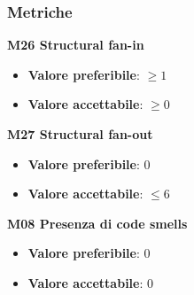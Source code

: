         \subsubsection{Metriche}
            \textbf{M26 Structural fan-in}
                \begin{itemize}
                    \item \textbf{Valore preferibile}: $ \ge 1$
                    \item \textbf{Valore accettabile}: $ \ge 0$
                \end{itemize}
            \textbf{M27 Structural fan-out}
                \begin{itemize}
                    \item \textbf{Valore preferibile}: $0$
                    \item \textbf{Valore accettabile}: $ \le 6$
                \end{itemize}
            \textbf{M08 Presenza di code smells}
            \begin{itemize}
            	\item \textbf{Valore preferibile}: $0$
            	\item \textbf{Valore accettabile}: $0$
            \end{itemize}
            
